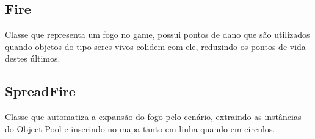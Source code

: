 	\subsection{Fire}
Classe que representa um fogo no game, possui pontos de dano que são utilizados quando objetos do tipo seres vivos colidem com ele, reduzindo os pontos de vida destes últimos.


	\subsection{SpreadFire}
Classe que automatiza a expansão do fogo pelo cenário, extraindo as instâncias do Object Pool e inserindo no mapa tanto em linha quando em circulos.